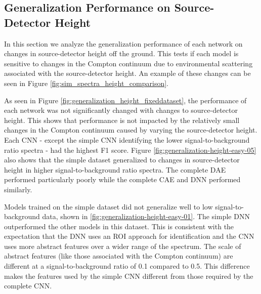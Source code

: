 



\subsection{Generalization Performance on Source-Detector Height}

In this section we analyze the generalization performance of each network on changes in source-detector height off the ground. This tests if each model is sensitive to changes in the Compton continuum due to environmental scattering associated with the source-detector height. An example of these changes can be seen in Figure \ref{fig:sim_spectra_height_comparison}.

As seen in Figure \ref{fig:generalization_height_fixeddataset}, the performance of each network was not significantly changed with changes to source-detector height. This shows that performance is not impacted by the relatively small changes in the Compton continuum caused by varying the source-detector height. Each CNN - except the simple CNN identifying the lower signal-to-background ratio spectra - had the highest F1 score. Figure \ref{fig:generalization-height-easy-05} also shows that the simple dataset generalized to changes in source-detector height in higher signal-to-background ratio spectra. The complete DAE performed particularly poorly while the complete CAE and DNN performed similarly.

Models trained on the simple dataset did not generalize well to low signal-to-background data, shown in \ref{fig:generalization-height-easy-01}. The simple DNN outperformed the other models in this dataset. This is consistent with the expectation that the DNN uses an ROI approach for identification and the CNN uses more abstract features over a wider range of the spectrum. The scale of abstract features (like those associated with the Compton continuum) are different at a signal-to-background ratio of 0.1 compared to 0.5. This difference makes the features used by the simple CNN different from those required by the complete CNN.


